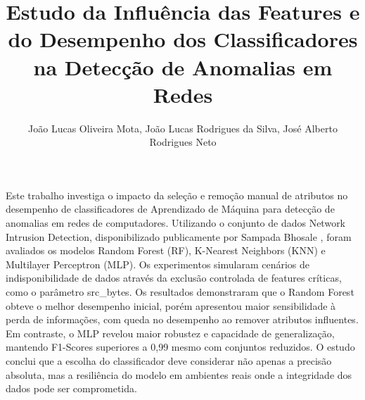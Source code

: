 \documentclass[12pt]{article}
\title{Estudo da Influência das Features e do Desempenho dos Classificadores na Detecção de Anomalias em Redes}
\author{
João Lucas Oliveira Mota\inst{1},
João Lucas Rodrigues da Silva\inst{2},
José Alberto Rodrigues Neto\inst{2}
}
\begin{document}
\maketitle

\begin{resumo}
Este trabalho investiga o impacto da seleção e remoção manual de atributos no desempenho de classificadores de Aprendizado de Máquina para detecção de anomalias em redes de computadores. Utilizando o conjunto de dados Network Intrusion Detection, disponibilizado publicamente por Sampada Bhosale \cite{dataset_kaggle}, foram avaliados os modelos Random Forest (RF), K-Nearest Neighbors (KNN) e Multilayer Perceptron (MLP). Os experimentos simularam cenários de indisponibilidade de dados através da exclusão controlada de features críticas, como o parâmetro src\_bytes. Os resultados demonstraram que o Random Forest obteve o melhor desempenho inicial, porém apresentou maior sensibilidade à perda de informações, com queda no desempenho ao remover atributos influentes. Em contraste, o MLP revelou maior robustez e capacidade de generalização, mantendo F1-Scores superiores a 0,99 mesmo com conjuntos reduzidos. O estudo conclui que a escolha do classificador deve considerar não apenas a precisão absoluta, mas a resiliência do modelo em ambientes reais onde a integridade dos dados pode ser comprometida.
\end{resumo}










\clearpage
\appendix

\clearpage

\end{document}
